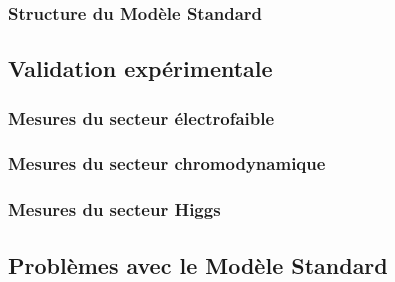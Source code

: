 \subsubsection{Structure du Modèle Standard}
\label{sec:ms:th:struct}

\blindtext

\subsection{Validation expérimentale}
\label{sec:ms:exp}

\subsubsection{Mesures du secteur électrofaible}
\label{sec:ms:exp:ewk}

\subsubsection{Mesures du secteur chromodynamique}
\label{sec:ms:exp:qcd}

\subsubsection{Mesures du secteur Higgs}
\label{sec:ms:exp:higgs}

\subsection{Problèmes avec le Modèle Standard}
\label{sec:ms:problemes}
